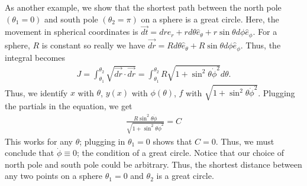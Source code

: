 \begin{example}
    As another example, we show that the shortest path between the north pole $(\theta_{1} = 0)$ and south pole $(\theta_{2} = \pi)$ on a sphere is a great circle. Here, the movement in spherical coordinates is $\vec{dt} = dr \hat{e}_{r} + rd\theta \hat{e}_{\theta} + r \sin \theta d\phi \hat{e}_{\phi}$. For a sphere, $R$ is constant so really we have $\vec{dr} = Rd \theta \hat{e}_{\theta} + R \sin \theta d\phi \hat{e}_{\phi}$. Thus, the integral becomes
    \begin{align}
        J = \int_{\theta_{1}}^{\theta_{2}} \sqrt{\vec{dr} \cdot \vec{dr}} = \int_{\theta_{1}}^{\theta_{2}} R \sqrt{1 + \sin^{2}\theta \dot{\phi}^{2}} d \theta.
    \end{align}
    Thus, we identify $x$ with $\theta$, $y(x)$ with $\phi(\theta)$, $f$ with $\sqrt{1+\sin^{2}\theta \dot{\phi}^{2}}$. Plugging the partials in the equation, we get
    \begin{align}
        \frac{R\sin^{2}\theta\dot{\phi}}{\sqrt{1+\sin^{2}\theta \dot{\phi}^{2}}} = C
    \end{align}
    This works for any $\theta$; plugging in $\theta_{1} = 0$ shows that $C = 0$. Thus, we must conclude that $\dot{\phi} \equiv 0$; the condition of a great circle. Notice that our choice of north pole and south pole could be arbitrary. Thus, the shortest distance between any two points on a sphere $\theta_{1} = 0$ and $\theta_{2}$ is a great circle.
\end{example}
